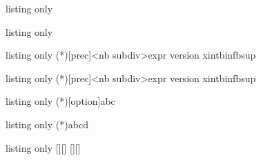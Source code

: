 \begin{PresCodeTexPL}{listing only}
\pflcalcrecurr
{}
\pfltoilerecurr
\end{PresCodeTexPL}

\begin{PresCodeTexPL}{listing only}
\pflsolseuil
\end{PresCodeTexPL}

\begin{PresCodeTexPL}{listing only}
\pflintegrapproch
\CalcIntegrale(*)[prec]<nb subdiv>{expr version xint}{binf}{bsup}
\pflvalintegr
\end{PresCodeTexPL}

\begin{PresCodeTexPL}{listing only}
\ValeurMoyenneIntg(*)[prec]<nb subdiv>{expr version xint}{binf}{bsup}
\pflvalmoyintegr
\end{PresCodeTexPL}

\begin{PresCodeTexPL}{listing only}
\FormeCanonique(*)[option]{a}{b}{c}
\pflformcanoniq
\end{PresCodeTexPL}

\begin{PresCodeTexPL}{listing only}
\FonctionHomographique(*){a}{b}{c}{d}
\pflfcthomogr
\end{PresCodeTexPL}

\begin{PresCodeTexPL}{listing only}
[\tmpmax][\tmpmaxvalx]
\pfldetmax
{}[\tmpmin][\tmpminvalx]
\pfldetmin
\end{PresCodeTexPL}

%
%
%

